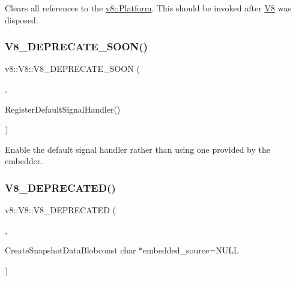 Clears all references to the \mbox{\hyperlink{classv8_1_1Platform}{v8\+::\+Platform}}. This should be invoked after \mbox{\hyperlink{classv8_1_1V8}{V8}} was disposed. \mbox{\label{classv8_1_1V8_a4e1339bb218a43e6776dea1a20340115}} 
\subsubsection{\texorpdfstring{V8\+\_\+\+D\+E\+P\+R\+E\+C\+A\+T\+E\+\_\+\+S\+O\+O\+N()}{V8\_DEPRECATE\_SOON()}}
{\footnotesize\ttfamily v8\+::\+V8\+::\+V8\+\_\+\+D\+E\+P\+R\+E\+C\+A\+T\+E\+\_\+\+S\+O\+ON (\begin{DoxyParamCaption}\item[{\char`\"{}Use \mbox{\hyperlink{classv8_1_1V8_a3a21191d183bf7b1235d029e6fdf438f}{Enable\+Web\+Assembly\+Trap\+Handler}}\char`\"{}}]{,  }\item[{static bool }]{Register\+Default\+Signal\+Handler() }\end{DoxyParamCaption})}

Enable the default signal handler rather than using one provided by the embedder. \mbox{\label{classv8_1_1V8_a18084f04050024b3e266277412737282}} 
\subsubsection{\texorpdfstring{V8\+\_\+\+D\+E\+P\+R\+E\+C\+A\+T\+E\+D()}{V8\_DEPRECATED()}\hspace{0.1cm}{\footnotesize\ttfamily [1/2]}}
{\footnotesize\ttfamily v8\+::\+V8\+::\+V8\+\_\+\+D\+E\+P\+R\+E\+C\+A\+T\+ED (\begin{DoxyParamCaption}\item[{\char`\"{}Use \mbox{\hyperlink{classv8_1_1SnapshotCreator}{Snapshot\+Creator}}\char`\"{}}]{,  }\item[{static \mbox{\hyperlink{classv8_1_1StartupData}{Startup\+Data}} }]{Create\+Snapshot\+Data\+Blobconst char $\ast$embedded\+\_\+source=\+N\+U\+LL }\end{DoxyParamCaption})}

